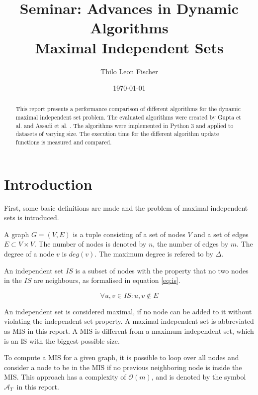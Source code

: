 \documentclass[letterpaper,11pt]{article}
\newcommand{\trivial}{$\mathcal{A}_T$\ }
\begin{document}
\title{Seminar: Advances in Dynamic Algorithms \\ Maximal Independent Sets}
\author{Thilo Leon Fischer}
\date{\today}
\maketitle

\begin{abstract}
This report presents a performance comparison of different algorithms for
the dynamic maximal independent set problem. The evaluated algorithms
were created by Gupta et al. \cite{gupta2018simple} and Assadi et al.
\cite{assadi2019fully}. The algorithms were implemented in Python 3
and applied to datasets of varying size. The execution time for the
different algorithm update functions is measured and compared.

\end{abstract}


\section{Introduction}
\label{sec:intro}

First, some basic definitions are made and the problem of maximal independent sets
is introduced.

A graph $G = (V, E)$ is a tuple consisting of a set of nodes $V$ and a set of
edges $E \subset V \times V$. The number of nodes is denoted by $n$, the number
of edges by $m$. The degree of a node $v$ is $deg(v)$. The maximum degree is
refered to by $\Delta$.

An independent set $IS$ is a subset of nodes with the property that no two nodes
in the $IS$ are neighbours, as formalised in equation \ref{eq:is}.

\begin{equation}
	\label{eq:is}
\forall u, v \in IS: {u, v} \notin E
\end{equation}

An independent set is considered maximal, if no node can be added to it without
violating the independent set property. A maximal independent set is abbreviated
as MIS in this report. A MIS is different from a maximum independent set, which
is an IS with the biggest possible size.

To compute a MIS for a given graph, it is possible to loop over all nodes and
consider a node to be in the MIS if no previous neighboring node is inside the
MIS. This approach has a complexity of $\mathcal{O}(m)$, and is denoted by the
symbol \trivial in this report.
\end{document}
